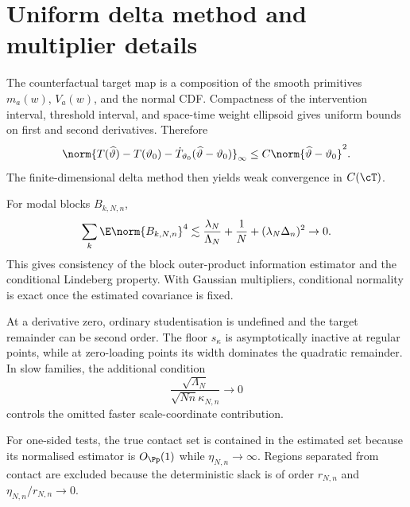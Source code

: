 \section{Uniform delta method and multiplier details}

The counterfactual target map is a composition of the smooth primitives $m_a(w)$, $V_a(w)$, and the normal CDF. Compactness of the intervention interval, threshold interval, and space-time weight ellipsoid gives uniform bounds on first and second derivatives. Therefore
\[
 \norm{T(\widehat\vartheta)-T(\vartheta_0)-\dot T_{\vartheta_0}(\widehat\vartheta-\vartheta_0)}_\infty
 \le C\norm{\widehat\vartheta-\vartheta_0}^2.
\]
The finite-dimensional delta method then yields weak convergence in $C(\cT)$.

For modal blocks $B_{k,N,n}$,
\[
 \sum_k\E\norm{B_{k,N,n}}^4
 \lesssim\frac{\lambda_N}{\Lambda_N}+\frac1N+(\lambda_N\Delta_n)^2\to0.
\]
This gives consistency of the block outer-product information estimator and the conditional Lindeberg property. With Gaussian multipliers, conditional normality is exact once the estimated covariance is fixed.

At a derivative zero, ordinary studentisation is undefined and the target remainder can be second order. The floor $s_\kappa$ is asymptotically inactive at regular points, while at zero-loading points its width dominates the quadratic remainder. In slow families, the additional condition
\[
 \frac{\sqrt{\Lambda_N}}{\sqrt{Nn}\kappa_{N,n}}\to0
\]
controls the omitted faster scale-coordinate contribution.

For one-sided tests, the true contact set is contained in the estimated set because its normalised estimator is $O_{\Pp}(1)$ while $\eta_{N,n}\to\infty$. Regions separated from contact are excluded because the deterministic slack is of order $r_{N,n}$ and $\eta_{N,n}/r_{N,n}\to0$.
